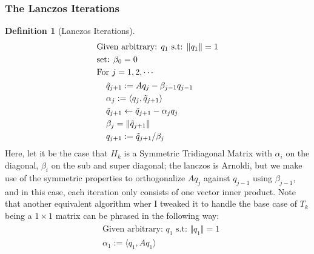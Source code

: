 \documentclass[]{article}
\theoremstyle{definition}
\newtheorem{definition}{Definition}
\begin{document}
        \subsubsection{The Lanczos Iterations}
            \begin{definition}[Lanczos Iterations]
                \begin{align}
                    & \text{Given arbitrary: } q_1 \text{ s.t: } \Vert q_1\Vert = 1
                    \\
                    & \text{set: }\beta_0 = 0
                    \\
                    & \text{For } j = 1, 2, \cdots 
                    \\
                    &\hspace{1.1em}\begin{aligned}
                        & \tilde{q}_{j + 1} := Aq_j - \beta_{j - 1}q_{j - 1}
                        \\
                        & \alpha_j := \langle q_j,\tilde{q}_{j + 1}\rangle
                        \\
                        & \tilde{q}_{j + 1} \leftarrow \tilde{q}_{j + 1} - \alpha_j q_j
                        \\
                        & \beta_j = \Vert \tilde{q}_{j + 1}\Vert
                        \\
                        & q_{j + 1} := \tilde{q}_{j + 1}/\beta_j
                    \end{aligned}
                \end{align}
                Here, let it be the case that $H_k$ is a Symmetric Tridiagonal Matrix with $\alpha_i$ on the diagonal, $\beta_i$ on the sub and super diagonal; the lanczos is Arnoldi, but we make use of the symmetric properties to orthogonalize $Aq_j$ against $q_{j - 1}$ using $\beta_{j-1}$, and in this case, each iteration only consists of one vector inner product. 
                Note that another equivalent algorithm wher I tweaked it to handle the base case of $T_k$ being a $1\times 1 $ matrix can be phrased in the following way: 
                \begin{align}
                    \begin{aligned}
                        & \text{Given arbitrary: }q_1 \text{ s.t: } \Vert q_1\Vert = 1
                        \\
                        & \alpha_1 := \langle q_1, Aq_1\rangle
                        \\

\end{aligned}
\end{align}
\end{definition}
\end{document}
